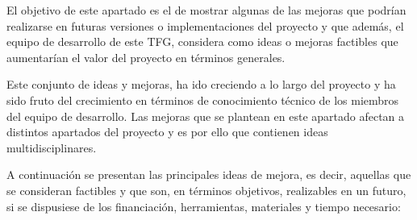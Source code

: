 El objetivo de este apartado es el de mostrar algunas de las mejoras que podrían realizarse en futuras versiones o implementaciones del proyecto y que además, el equipo de desarrollo de este TFG, considera como ideas o mejoras factibles que aumentarían el valor del proyecto en términos generales.

Este conjunto de ideas y mejoras, ha ido creciendo a lo largo del proyecto y ha sido fruto del crecimiento en términos de conocimiento técnico de los miembros del equipo de desarrollo. Las mejoras que se plantean en este apartado afectan a distintos apartados del proyecto y es por ello que contienen ideas multidisciplinares.

A continuación se presentan las principales ideas de mejora, es decir, aquellas que se consideran factibles y que son, en términos objetivos, realizables en un futuro, si se dispusiese de los financiación, herramientas, materiales y tiempo necesario:

